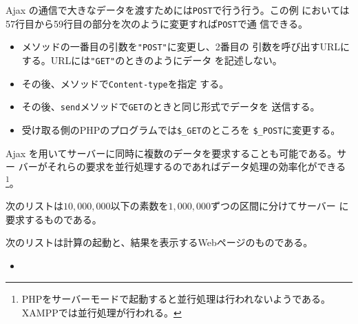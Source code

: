 Ajax の通信で大きなデータを渡すためには\texttt{POST}で行う行う。この例
においては57行目から59行目の部分を次のように変更すれば\texttt{POST}で通
信できる。
\begin{itemize}
 \item {}メソッドの一番目の引数を\Verb+"POST"+に変更し、2番目の
			 引数を呼び出すURLにする。URLには\Verb+"GET"+のときのようにデータ
			 を記述しない。
 \item その後、メソッドで\Verb+Content-type+を指定
			 する。
 \item その後、\Verb+send+メソッドで\Verb+GET+のときと同じ形式でデータを
			 送信する。
 \item 受け取る側のPHPのプログラムでは\Verb+$_GET+のところを
			 \Verb+$_POST+に変更する。
\end{itemize}
Ajax を用いてサーバーに同時に複数のデータを要求することも可能である。サー
バーがそれらの要求を並行処理するのであればデータ処理の効率化ができる
\footnote{PHPをサーバーモードで起動すると並行処理は行われないようである。
XAMPPでは並行処理が行われる。}。
\begin{Exec}\upshape\label{contPrimes}
 次のリストは$10,000,000$以下の素数を$1,000,000$ずつの区間に分けてサーバー
 に要求するものである。

 次のリストは計算の起動と、結果を表示するWebページのものである。
 \begin{itemize}
  \item 
 \end{itemize}

\end{Exec}